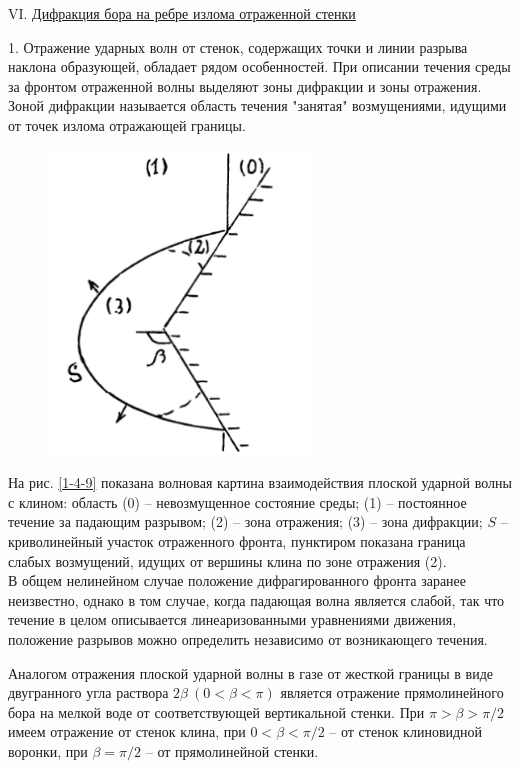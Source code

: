 \documentclass[specialist, subf, href, colorlinks=true, 14pt, final]{disser}
\theoremstyle{definition}
\begin{document}
\noindent VI. \underline{Дифракция бора на ребре излома отраженной стенки}

1. Отражение ударных волн от стенок, содержащих точки и линии разрыва наклона образующей, обладает рядом особенностей. При описании течения среды за фронтом отраженной волны выделяют зоны дифракции и зоны отражения. Зоной дифракции называется область течения "занятая"{} возмущениями, идущими от точек излома отражающей границы.
\begin{figure} 
  \includegraphics[width=70mm]{pics/1-4-9.png}
  \caption{}
  \label{1-4-9}
\end{figure}
На рис. \eqref{1-4-9} показана волновая картина взаимодействия плоской ударной волны с клином: область (0) -- невозмущенное состояние среды; (1) -- постоянное течение за падающим разрывом; (2) -- зона отражения; (3) -- зона дифракции; $S$ -- криволинейный участок отраженного фронта, пунктиром показана граница слабых возмущений, идущих от вершины клина по зоне отражения (2).\\

В общем нелинейном случае положение дифрагированного фронта заранее неизвестно, однако в том случае, когда падающая волна является слабой, так что течение в целом описывается линеаризованными уравнениями движения, положение разрывов можно определить независимо от возникающего течения.

Аналогом отражения плоской ударной волны в газе от жесткой границы в виде двугранного угла раствора $2\beta\ (0 < \beta < \pi)$ является отражение прямолинейного бора на мелкой воде от соответствующей вертикальной стенки. При $\pi > \beta > \pi/2$ имеем отражение от стенок клина, при $0 < \beta < \pi/2$ -- от стенок клиновидной воронки, при $\beta = \pi/2$ -- от прямолинейной стенки.
\end{document}
